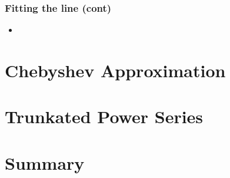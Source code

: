 \documentclass[10pt]{beamer}
\begin{document}
\begin{frame}
  \frametitle{Fitting the line (cont)}
  \begin{itemize}
  \item 
  \end{itemize}
\end{frame}

\section{Chebyshev Approximation}

\section{Trunkated Power Series}

\section{Summary}
\end{document}
